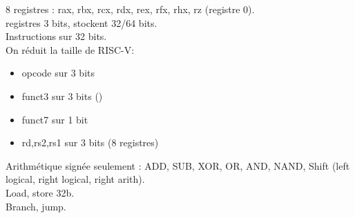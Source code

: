 \documentclass[a4paper]{article}
\begin{document}
    8 registres : rax, rbx, rcx, rdx, rex, rfx, rhx, rz (registre 0).\\
    registres 3 bits, stockent 32/64 bits.\\
    Instructions sur 32 bits.\\
    On réduit la taille de RISC-V:\begin{itemize}
        \item opcode sur 3 bits
        \item funct3 sur 3 bits ()
        \item funct7 sur 1 bit 
        \item rd,rs2,rs1 sur 3 bits (8 registres)
    \end{itemize}
    Arithmétique signée seulement : ADD, SUB, XOR, OR, AND, NAND, Shift (left logical, right logical, right arith).\\
    Load, store 32b.\\
    Branch, jump.\\
\end{document}
